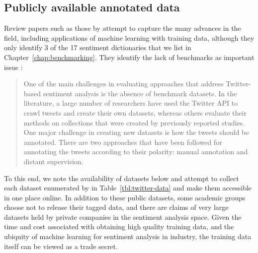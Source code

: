 \subsection{Publicly available annotated data}
Review papers such as those by \cite{giachanou2016like} attempt to capture the many advances in the field, including applications of machine learning with training data, although they only identify 3 of the 17 sentiment dictionaries that we list in Chapter~\ref{chap:benchmarking}.
They identify the lack of benchmarks as important issue \citep{giachanou2016like}:
\begin{quote}
  One of the main challenges in evaluating approaches that address Twitter-based sentiment analysis is the absence of benchmark datasets. In the literature, a large number of researchers have used the Twitter API to crawl tweets and create their own datasets, whereas others evaluate their methods on collections that were created by previously reported studies. One major challenge in creating new datasets is how the tweets should be annotated. There are two approaches that have been followed for annotating the tweets according to their polarity: manual annotation and distant supervision.
\end{quote}
To this end, we note the availability of datasets below and attempt to collect each dataset enumerated by \cite{giachanou2016like,saif2013evaluation,ribeiro2016sentibench} in Table~\ref{tbl:twitter-data} and make them accessible in one place online.
In addition to these public datasets, some academic groups choose not to release their tagged data, and there are claims of very large datasets held by private companies in the sentiment analysis space.
Given the time and cost associated with obtaining high quality training data, and the ubiquity of machine learning for sentiment analysis in industry, the training data itself can be viewed as a trade secret.

\begin{table}
  \begin{center}
  {\tiny
    
  }
  \end{center}
  \caption{Summary of publicly available Twitter datasets tagged with sentiment labels.
    In respect of Twitter's Terms of Service, lists of the Tweet IDs are provided, as well as a script to download the Tweets through Twitter's public API (note some data may no longer be available).
  We shorten the references as follows: G: \cite{giachanou2016like}, S: \cite{saif2013evaluation}, R: \cite{ribeiro2016sentibench}, and L: \cite{luo2012opinion}.}
  \label{tbl:twitter-data}
\end{table}


